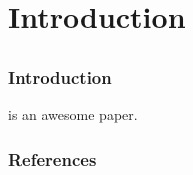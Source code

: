 \documentclass[beaver,8pt,compress,notheorems,xcolor={svgnames},hyperref={colorlinks,allcolors=blue}]{beamer}
\makeatletter
\def\beamer@writeslidentry@miniframesoff{%
  \expandafter\beamer@ifempty\expandafter{\beamer@framestartpage}{}%
  {%
    \clearpage\beamer@notesactions%
  }
}
\newcommand*{\miniframesoff}{\let\beamer@writeslidentry=\beamer@writeslidentry@miniframesoff}
\makeatother
\begin{document}
\section{Introduction}
\subsection{}

\begin{frame}
\frametitle{Introduction}
\citet{einstein} is an awesome paper.
\end{frame}

\miniframesoff

\begin{frame}
\frametitle{References}
\printbibliography[heading=none]
\end{frame}
\end{document}
